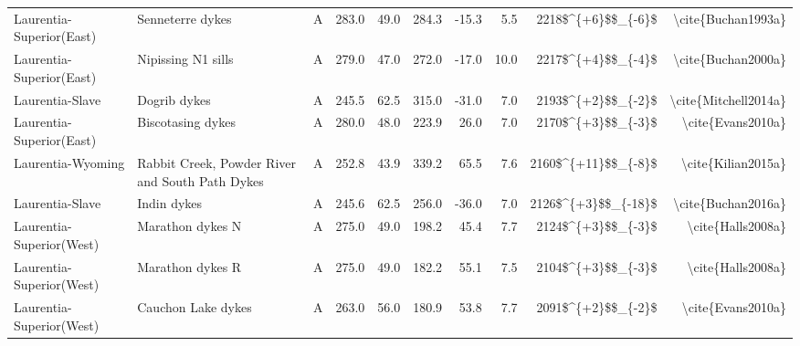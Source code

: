 \begin{longtable}{p{1 in}p{1 in}rrrrrrrr}
      Laurentia-Superior(East) &                                 Senneterre dykes &      A &     283.0 &      49.0 & 284.3 & -15.3 &       5.5 &     2218\$\textasciicircum \{+6\}\$\$\_\{-6\}\$ &                                 \textbackslash cite\{Buchan1993a\} \\
      Laurentia-Superior(East) &                               Nipissing N1 sills &      A &     279.0 &      47.0 & 272.0 & -17.0 &      10.0 &     2217\$\textasciicircum \{+4\}\$\$\_\{-4\}\$ &                                 \textbackslash cite\{Buchan2000a\} \\
               Laurentia-Slave &                                     Dogrib dykes &      A &     245.5 &      62.5 & 315.0 & -31.0 &       7.0 &     2193\$\textasciicircum \{+2\}\$\$\_\{-2\}\$ &                               \textbackslash cite\{Mitchell2014a\} \\
      Laurentia-Superior(East) &                                Biscotasing dykes &      A &     280.0 &      48.0 & 223.9 &  26.0 &       7.0 &     2170\$\textasciicircum \{+3\}\$\$\_\{-3\}\$ &                                  \textbackslash cite\{Evans2010a\} \\
             Laurentia-Wyoming &  Rabbit Creek, Powder River and South Path Dykes &      A &     252.8 &      43.9 & 339.2 &  65.5 &       7.6 &    2160\$\textasciicircum \{+11\}\$\$\_\{-8\}\$ &                                 \textbackslash cite\{Kilian2015a\} \\
               Laurentia-Slave &                                      Indin dykes &      A &     245.6 &      62.5 & 256.0 & -36.0 &       7.0 &    2126\$\textasciicircum \{+3\}\$\$\_\{-18\}\$ &                                 \textbackslash cite\{Buchan2016a\} \\
      Laurentia-Superior(West) &                                 Marathon dykes N &      A &     275.0 &      49.0 & 198.2 &  45.4 &       7.7 &     2124\$\textasciicircum \{+3\}\$\$\_\{-3\}\$ &                                  \textbackslash cite\{Halls2008a\} \\
      Laurentia-Superior(West) &                                 Marathon dykes R &      A &     275.0 &      49.0 & 182.2 &  55.1 &       7.5 &     2104\$\textasciicircum \{+3\}\$\$\_\{-3\}\$ &                                  \textbackslash cite\{Halls2008a\} \\
      Laurentia-Superior(West) &                               Cauchon Lake dykes &      A &     263.0 &      56.0 & 180.9 &  53.8 &       7.7 &     2091\$\textasciicircum \{+2\}\$\$\_\{-2\}\$ &                                  \textbackslash cite\{Evans2010a\} \\

\end{longtable}
